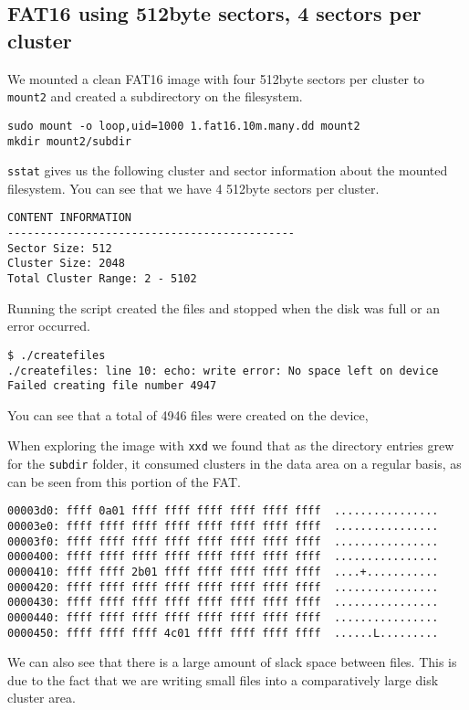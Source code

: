 \documentclass[a4paper,
    11pt,
    normalheadings,
    parindent,
    UKenglish,
    abstracton,
    ]{scrartcl}
\begin{document}
\subsection{FAT16 using 512byte sectors, 4 sectors per cluster}
We mounted a clean FAT16 image with four 512byte sectors per cluster to \texttt{mount2} and created a subdirectory on the filesystem.

\begin{verbatim}
sudo mount -o loop,uid=1000 1.fat16.10m.many.dd mount2
mkdir mount2/subdir
\end{verbatim}

\texttt{sstat} gives us the following cluster and sector information about the mounted filesystem. You can see that we have 4 512byte sectors per cluster.
\begin{verbatim}
CONTENT INFORMATION
--------------------------------------------
Sector Size: 512
Cluster Size: 2048
Total Cluster Range: 2 - 5102
\end{verbatim}

Running the script created the files and stopped when the disk was full or an error occurred.
\begin{verbatim}
$ ./createfiles 
./createfiles: line 10: echo: write error: No space left on device
Failed creating file number 4947
\end{verbatim}
You can see that a total of 4946 files were created on the device, 

When exploring the image with \texttt{xxd} we found that as the directory entries grew for the \texttt{subdir} folder, it consumed clusters in the data area on a regular basis, as can be seen from this portion of the FAT.

\begin{verbatim}
00003d0: ffff 0a01 ffff ffff ffff ffff ffff ffff  ................
00003e0: ffff ffff ffff ffff ffff ffff ffff ffff  ................
00003f0: ffff ffff ffff ffff ffff ffff ffff ffff  ................
0000400: ffff ffff ffff ffff ffff ffff ffff ffff  ................
0000410: ffff ffff 2b01 ffff ffff ffff ffff ffff  ....+...........
0000420: ffff ffff ffff ffff ffff ffff ffff ffff  ................
0000430: ffff ffff ffff ffff ffff ffff ffff ffff  ................
0000440: ffff ffff ffff ffff ffff ffff ffff ffff  ................
0000450: ffff ffff ffff 4c01 ffff ffff ffff ffff  ......L.........
\end{verbatim}

We can also see that there is a large amount of slack space between files. This is due to the fact that we are writing small files into a comparatively large disk cluster area.
\end{document}
